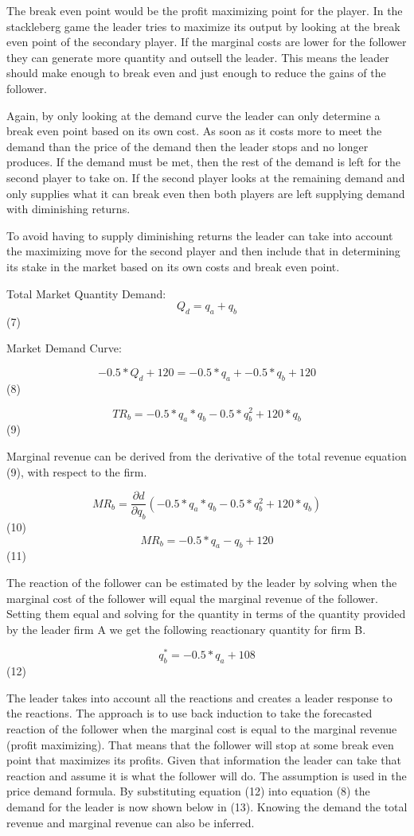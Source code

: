 The break even point would be the profit maximizing point for the player. 
In the stackleberg game the leader tries to maximize its output by 
looking at the break even point of the secondary player. If the 
marginal costs are lower for the follower they can generate more 
quantity and outsell the leader. This means the leader should make
enough to break even and just enough to reduce the gains of the follower.

Again, by only looking at the demand curve the leader can only 
determine a break even point based on its own cost. As soon as 
it costs more to meet the demand than the price of the demand 
then the leader stops and no longer produces. If the demand must be met, 
then the rest of the demand is left for the second player to take on. 
If the second player looks at the remaining demand and only supplies 
what it can break even then both players are left supplying demand 
with diminishing returns.

To avoid having to supply diminishing returns the leader can take 
into account the maximizing move for the second player and then 
include that in determining its stake in the market based on its 
own costs and break even point.

Total Market Quantity Demand:
$$ Q_{d}= q_{a} + q_{b}$$(7)

Market Demand Curve:

$$ -0.5*Q_{d} + 120 = -0.5*q_{a} + -0.5*q_{b} + 120$$(8)

$$TR_{b} = -0.5*q_{a}*q_{b} - 0.5*q_{b}^2 + 120*q_{b}$$(9)

Marginal revenue can be derived from the derivative of the total 
revenue equation (9), with respect to the firm.

$$ MR_{b} = \frac{\partial d}{\partial q_{b}}(-0.5*q_{a}*q_{b} - 0.5*q_{b}^2 + 120*q_{b})$$ (10)
$$ MR_{b} = -0.5*q_{a} - q_{b} + 120$$ (11)

The reaction of the follower can be estimated by the leader by 
solving when the marginal cost of the follower will equal the 
marginal revenue of the follower. Setting them equal and solving 
for the quantity in terms of the quantity provided by the leader 
firm A we get the following reactionary quantity for firm B.

$$ q_{b}^* = -0.5*q_{a} + 108$$ (12)

The leader takes into account all the reactions and creates a 
leader response to the reactions. The approach is to use back 
induction to take the forecasted reaction of the follower when 
the marginal cost is equal to the marginal revenue (profit maximizing). 
That means that the follower will stop at some break even point 
that maximizes its profits. Given that information the leader can 
take that reaction and assume it is what the follower will do. 
The assumption is used in the price demand formula. By substituting 
equation (12) into equation (8) the demand for the leader is now 
shown below in (13). Knowing the demand the total revenue and 
marginal revenue can also be inferred.

